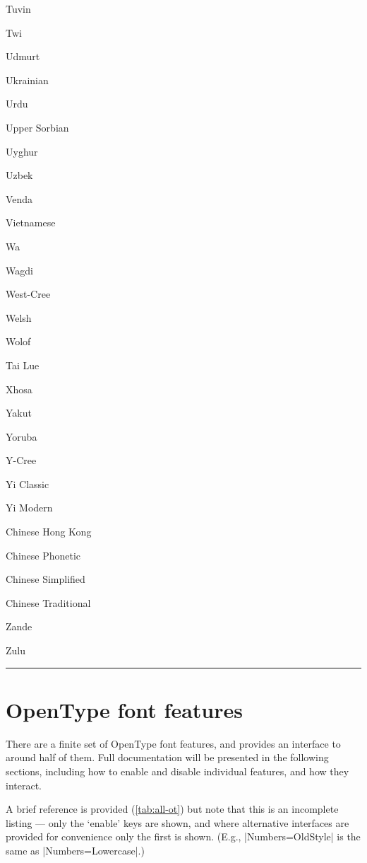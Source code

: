 \documentclass[a4paper]{l3doc}
\begin{document}
\begin{table}[p]
\begin{minipage}{\linewidth+4cm}
\begin{multicols}{6}
    Tuvin \par
    Twi \par
    Udmurt \par
    Ukrainian \par
    Urdu \par
    Upper Sorbian \par
    Uyghur \par
    Uzbek \par
    Venda \par
    Vietnamese \par
    Wa \par
    Wagdi \par
    West-Cree \par
    Welsh \par
    Wolof \par
    Tai Lue \par
    Xhosa \par
    Yakut \par
    Yoruba \par
    Y-Cree \par
    Yi Classic \par
    Yi Modern \par
    Chinese Hong Kong \par
    Chinese Phonetic \par
    Chinese Simplified \par
    Chinese Traditional \par
    Zande \par
    Zulu
  \end{multicols}
  \hspace{4pt}
  \hrule
 \end{minipage}
\end{table}


\section{OpenType font features}
\label{sec:ot-feat}

There are a finite set of OpenType font features, and  provides an
interface to around half of them.
Full documentation will be presented in the following sections, including how to
enable and disable individual features, and how they interact.

A brief reference is provided (\vref{tab:all-ot}) but note that this is an incomplete
listing --- only the `enable' keys are shown, and where alternative interfaces are
provided for convenience only the first is shown.
(E.g., |Numbers=OldStyle| is the same as |Numbers=Lowercase|.)
\end{document}
